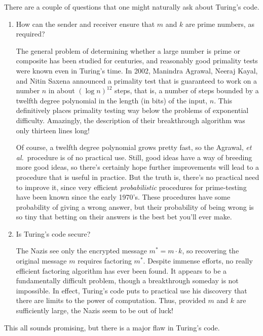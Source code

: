 There are a couple of questions that one might naturally ask about Turing's
code.

\begin{enumerate}

\item How can the sender and receiver ensure that $m$ and $k$ are
prime numbers, as required?

The general problem of determining whether a large number is prime or
composite has been studied for centuries, and reasonably good primality
tests were known even in Turing's time.  In 2002, Manindra Agrawal, Neeraj
Kayal, and Nitin Saxena announced a primality test that is guaranteed to
work on a number $n$ in about $(\log n)^{12}$ steps, that is, a number of
steps bounded by a twelfth degree polynomial in the length (in bits) of
the input, $n$.  This definitively places primality testing way below the
problems of exponential difficulty.  Amazingly, the description of their
breakthrough algorithm was only thirteen lines long!

Of course, a twelfth degree polynomial grows pretty fast, so the
Agrawal,\emph{ et al.}\ procedure is of no practical use.  Still, good
ideas have a way of breeding more good ideas, so there's certainly hope
further improvements will lead to a procedure that is useful in practice.
But the truth is, there's no practical need to improve it, since very
efficient \emph{probabilistic} procedures for prime-testing have been
known since the early 1970's.  These procedures have some probability of
giving a wrong answer, but their probability of being wrong is so tiny
that betting on their answers is the best bet you'll ever make.

\item Is Turing's code secure?

The Nazis see only the encrypted message $m^* = m \cdot k$, so
recovering the original message $m$ requires factoring $m^*$.  Despite
immense efforts, no really efficient factoring algorithm has ever been
found.  It appears to be a fundamentally difficult problem, though a
breakthrough someday is not impossible.  In effect, Turing's code puts
to practical use his discovery that there are limits to the power of
computation.  Thus, provided $m$ and $k$ are sufficiently large, the
Nazis seem to be out of luck!

\end{enumerate}

This all sounds promising, but there is a major flaw in Turing's code.

